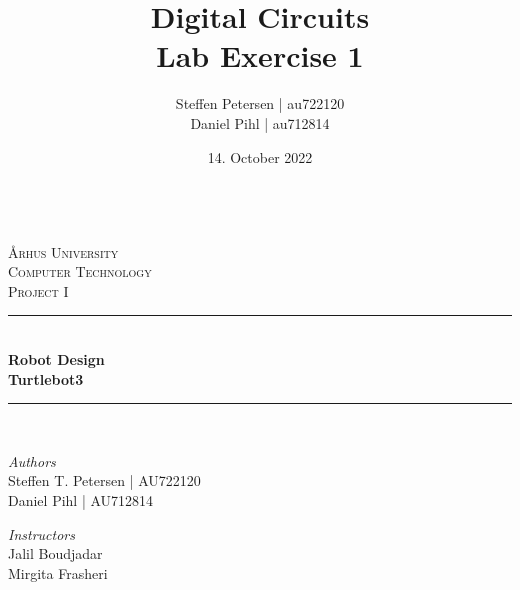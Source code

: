 \documentclass{article}
\title{\Huge Digital Circuits\\\LARGE Lab Exercise 1} %
\author{Steffen Petersen | au722120 \\ Daniel Pihl | au712814} %
\date{14. October 2022} %
\begin{document}

\begin{titlepage} %
  \newcommand{\HRule}{\rule{\linewidth}{0.5mm}} %

    \center %
    
    \textbf{\space}\\[2cm]   
    \textsc{\LARGE Århus University}\\[1.5cm] %
    
    \textsc{\Large Computer Technology}\\[0.5cm] %
    
    \textsc{\large Project I}\\[0.5cm] %
    
    
    \HRule\\[0cm]
    
    {\huge\bfseries Robot Design\\[0.1cm]}
    {\large\bfseries Turtlebot3\\}
    
    \HRule\\[1.5cm]
    
    
    \begin{minipage}{0.4\textwidth}
      \begin{flushleft}
        \large
        \textit{Authors}\\
        Steffen T. Petersen | AU722120\\
        Daniel Pihl | AU712814
      \end{flushleft}
    \end{minipage}
    \begin{minipage}{0.4\textwidth}
      \begin{flushright}
        \large\vspace{-4mm}
        \textit{Instructors}\\
        Jalil Boudjadar\\
        Mirgita Frasheri
      \end{flushright}
    \end{minipage}
    

\end{titlepage}
\end{document}
